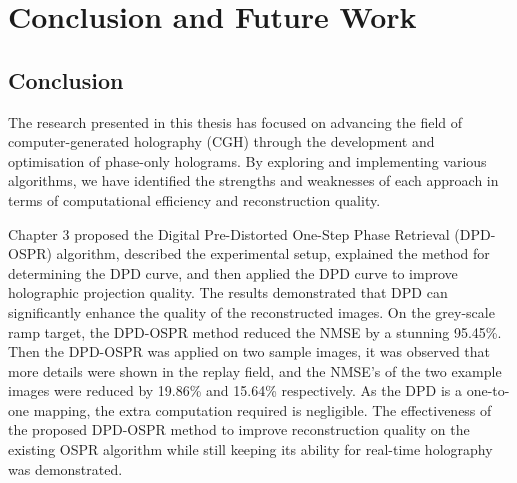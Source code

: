 
\chapter{Conclusion and Future Work}
\section{Conclusion}
The research presented in this thesis has focused on advancing the field of computer-generated holography (CGH) through the development and optimisation of phase-only holograms. By exploring and implementing various algorithms, we have identified the strengths and weaknesses of each approach in terms of computational efficiency and reconstruction quality.

Chapter 3 proposed the Digital Pre-Distorted One-Step Phase Retrieval (DPD-OSPR) algorithm, described the experimental setup, explained the method for determining the DPD curve, and then applied the DPD curve to improve holographic projection quality. The results demonstrated that DPD can significantly enhance the quality of the reconstructed images. On the grey-scale ramp target, the DPD-OSPR method reduced the NMSE by a stunning 95.45\%. Then the DPD-OSPR was applied on two sample images, it was observed that more details were shown in the replay field, and the NMSE's of the two example images were reduced by 19.86\% and 15.64\% respectively. As the DPD is a one-to-one mapping, the extra computation required is negligible. The effectiveness of the proposed DPD-OSPR method to improve reconstruction quality on the existing OSPR algorithm while still keeping its ability for real-time holography was demonstrated.

